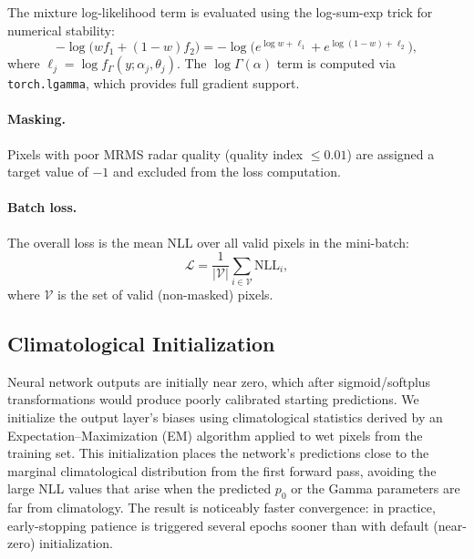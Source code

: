 \documentclass[11pt]{article}
\begin{document}
The mixture log-likelihood term is evaluated using the
log-sum-exp trick for numerical stability:
\begin{equation}
  -\log\!\bigl(w f_1 + (1-w) f_2\bigr)
  = -\log\!\big(e^{\log w + \ell_1} + e^{\log(1-w) + \ell_2}\big),
  \label{eq:logsumexp}
\end{equation}
where $\ell_j = \log f_{\Gamma}(y; \alpha_j, \theta_j)$.  The
$\log\Gamma(\alpha)$ term is computed via \texttt{torch.lgamma},
which provides full gradient support.

\paragraph{Masking.}
Pixels with poor MRMS radar quality (quality index
$\leq 0.01$) are assigned a target value of $-1$ and excluded
from the loss computation.

\paragraph{Batch loss.}
The overall loss is the mean NLL over all valid pixels in the
mini-batch:
\begin{equation}
  \mathcal{L} = \frac{1}{|\mathcal{V}|}
    \sum_{i \in \mathcal{V}} \text{NLL}_i,
  \label{eq:batch_loss}
\end{equation}
where $\mathcal{V}$ is the set of valid (non-masked) pixels.

\subsection{Climatological Initialization}
\label{sec:initialization}

Neural network outputs are initially near zero, which after
sigmoid/softplus transformations would produce poorly calibrated
starting predictions.  We initialize the output layer's biases
using climatological statistics derived by an Expectation--Maximization
(EM) algorithm applied to wet pixels from the training set.
This initialization places the network's predictions close to the
marginal climatological distribution from the first forward pass,
avoiding the large NLL values that arise when the predicted $p_0$
or the Gamma parameters are far from climatology.  The result is
noticeably faster convergence: in practice, early-stopping patience
is triggered several epochs sooner than with default (near-zero)
initialization.
\end{document}

